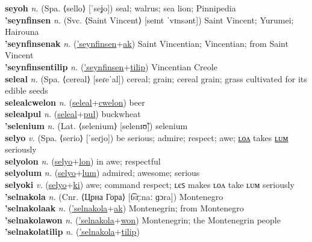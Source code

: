 \textbf{seyoh} \textit{n.} (Spa. ⟨sello⟩ [ˈseʝo])
seal; walrus; sea lion; Pinnipedia \label{seyoh} \\
\textbf{'seynfinsen} \textit{n.} (Svc. ⟨Saint Vincent⟩ [seɪnt ˈvɪnsənt])
Saint Vincent; Yurumei; Hairouna \label{'seynfinsen} \\
\textbf{'seynfinsenak} \textit{n.} (\hyperref['seynfinsen]{'seynfinsen}+\hyperref[ak]{ak})
Saint Vincentian; Vincentian; from Saint Vincent \label{'seynfinsenak} \\
\textbf{'seynfinsentilip} \textit{n.} (\hyperref['seynfinsen]{'seynfinsen}+\hyperref[tilip]{tilip})
Vincentian Creole \label{'seynfinsentilip} \\
\textbf{seleal} \textit{n.} (Spa. ⟨cereal⟩ [seɾeˈal])
cereal; grain; cereal grain; grass cultivated for its edible seeds \label{seleal} \\
\textbf{selealcwelon} \textit{n.} (\hyperref[seleal]{seleal}+\hyperref[cwelon]{cwelon})
beer \label{selealcwelon} \\
\textbf{selealpul} \textit{n.} (\hyperref[seleal]{seleal}+\hyperref[pul]{pul})
buckwheat \label{selealpul} \\
\textbf{'selenium} \textit{n.} (Lat. ⟨selenium⟩ [selenɪʊ̃])
selenium \label{'selenium} \\
\textbf{selyo} \textit{v.} (Spa. ⟨serio⟩ [ˈseɾjo])
be serious; admire; respect; awe; \hyperref[selyolon]{ʟᴏᴧ} takes \hyperref[selyolum]{ʟᴜᴍ} seriously \label{selyo} \\
\textbf{selyolon} \textit{n.} (\hyperref[selyo]{selyo}+\hyperref[lon]{lon})
in awe; respectful \label{selyolon} \\
\textbf{selyolum} \textit{n.} (\hyperref[selyo]{selyo}+\hyperref[lum]{lum})
admired; awesome; serious \label{selyolum} \\
\textbf{selyoki} \textit{v.} (\hyperref[selyo]{selyo}+\hyperref[ki]{ki})
awe; command respect; ʟєꜱ makes ʟᴏᴧ take ʟᴜᴍ seriously \label{selyoki} \\
\textbf{'selnakola} \textit{n.} (Cnr. ⟨Црна Гора⟩ [t͡sr̩ːnaː ɡɔra])
Montenegro \label{'selnakola} \\
\textbf{'selnakolaak} \textit{n.} (\hyperref['selnakola]{'selnakola}+\hyperref[ak]{ak})
Montenegrin; from Montenegro \label{'selnakolaak} \\
\textbf{'selnakolawon} \textit{n.} (\hyperref['selnakola]{'selnakola}+\hyperref[won]{won})
Montenegrin; the Montenegrin people \label{'selnakolawon} \\
\textbf{'selnakolatilip} \textit{n.} (\hyperref['selnakola]{'selnakola}+\hyperref[tilip]{tilip})
